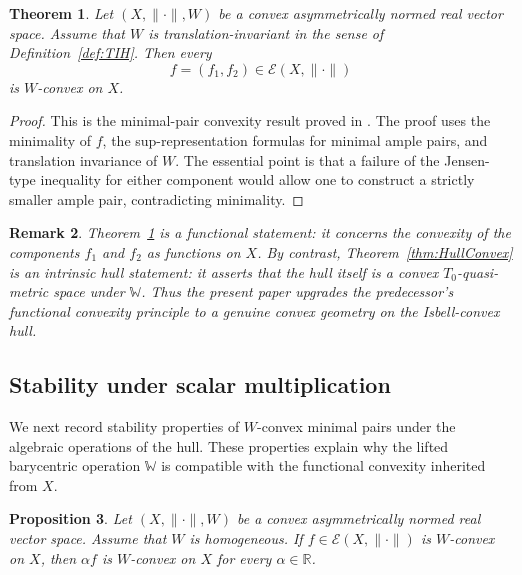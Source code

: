 \documentclass[preprint,12pt]{elsarticle}
\numberwithin{equation}{section}
\newtheorem{theorem}{Theorem}[section]
\newtheorem{proposition}[theorem]{Proposition}
\newtheorem{remark}[theorem]{Remark}
\newcommand{\E}{\mathcal{E}}
\begin{document}
\begin{theorem}\label{thm:minpairsWconvex}
Let \((X,\|\cdot\|,W)\) be a convex asymmetrically normed real vector space.
Assume that \(W\) is translation-invariant in the sense of
Definition~\ref{def:TIH}.  Then every
\[
f=(f_1,f_2)\in\E(X,\|\cdot\|)
\]
is \(W\)-convex on \(X\).
\end{theorem}

\begin{proof}
This is the minimal-pair convexity result proved in \cite{OlelaZweni2023}.
The proof uses the minimality of \(f\), the sup-representation formulas for
minimal ample pairs, and translation invariance of \(W\).  The essential point
is that a failure of the Jensen-type inequality for either component would
allow one to construct a strictly smaller ample pair, contradicting minimality.
\end{proof}

\begin{remark}\label{rem:functional-vs-intrinsic}
Theorem~\ref{thm:minpairsWconvex} is a functional statement: it concerns the
convexity of the components \(f_1\) and \(f_2\) as functions on \(X\).  By
contrast, Theorem~\ref{thm:HullConvex} is an intrinsic hull statement: it
asserts that the hull itself is a convex \(T_0\)-quasi-metric space under
\(\mathbb W\).  Thus the present paper upgrades the predecessor's functional
convexity principle to a genuine convex geometry on the Isbell-convex hull.
\end{remark}

\subsection{Stability under scalar multiplication}

We next record stability properties of \(W\)-convex minimal pairs under the
algebraic operations of the hull.  These properties explain why the lifted
barycentric operation \(\mathbb W\) is compatible with the functional
convexity inherited from \(X\).

\begin{proposition}\label{prop:scalarWconvex}
Let \((X,\|\cdot\|,W)\) be a convex asymmetrically normed real vector space.
Assume that \(W\) is homogeneous.  If \(f\in\E(X,\|\cdot\|)\) is
\(W\)-convex on \(X\), then \(\alpha f\) is \(W\)-convex on \(X\) for every
\(\alpha\in\mathbb R\).
\end{proposition}
\end{document}
